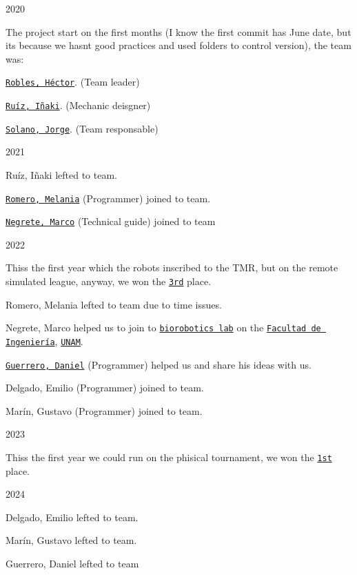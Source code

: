 \begin{DoxyItemize}
\item 2020
\begin{DoxyItemize}
\item The project start on the first months (I know the first commit has June date, but it\textquotesingle{}s because we hasn\textquotesingle{}t good practices and used folders to control version), the team was\+:
\item \href{https://github.com/Hector290601}{\tt Robles, Héctor}. (Team leader)
\item \href{https://github.com/Ricardo-Inaqui}{\tt Ruíz, Iñaki}. (Mechanic deisgner)
\item \href{https://github.com/jrg-sln}{\tt Solano, Jorge}. (Team responsable)
\end{DoxyItemize}
\item 2021
\begin{DoxyItemize}
\item Ruíz, Iñaki lefted to team.
\item \href{https://github.com/melaniaromero}{\tt Romero, Melania} (Programmer) joined to team.
\item \href{https://github.com/mnegretev}{\tt Negrete, Marco} (Technical guide) joined to team
\end{DoxyItemize}
\item 2022
\begin{DoxyItemize}
\item This\textquotesingle{}s the first year which the robot\textquotesingle{}s inscribed to the T\+MR, but on the remote simulated league, anyway, we won the \href{https://femexrobotica.org/tmr2022/resultados/}{\tt 3rd} place.
\item Romero, Melania lefted to team due to time issues.
\item Negrete, Marco helped us to join to \href{https://biorobotics.fi-p.unam.mx/es/}{\tt biorobotics lab} on the \href{https://www.ingenieria.unam.mx/}{\tt Facultad de Ingeniería}, \href{https://www.unam.mx/}{\tt U\+N\+AM}.
\item \href{https://github.com/danguer3}{\tt Guerrero, Daniel} (Programmer) helped us and share his ideas with us.
\item Delgado, Emilio (Programmer) joined to team.
\item Marín, Gustavo (Programmer) joined to team.
\end{DoxyItemize}
\item 2023
\begin{DoxyItemize}
\item This\textquotesingle{}s the first year we could run on the phisical tournament, we won the \href{https://femexrobotica.org/tmr2023/resultados/}{\tt 1st} place.
\end{DoxyItemize}
\item 2024
\begin{DoxyItemize}
\item Delgado, Emilio lefted to team.
\item Marín, Gustavo lefted to team.
\item Guerrero, Daniel lefted to team
\end{DoxyItemize}
\end{DoxyItemize}

